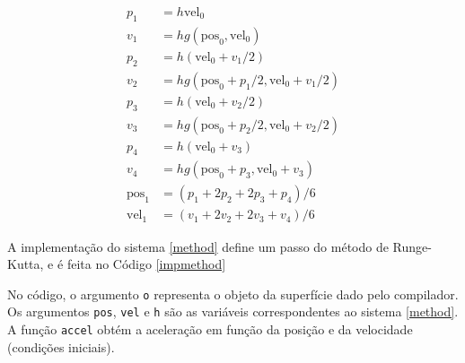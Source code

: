 \begin{equation}
\label{method}
\begin{split}
    p_1 & = h\text{vel}_0 \\
    v_1 & = hg(\text{pos}_0, \text{vel}_0) \\
    p_2 & = h(\text{vel}_0+v_1/2) \\
    v_2 & = hg(\text{pos}_0+p_1/2, \text{vel}_0+v_1/2) \\
    p_3 & = h(\text{vel}_0+v_2/2) \\
    v_3 & = hg(\text{pos}_0+p_2/2, \text{vel}_0+v_2/2) \\
    p_4 & = h(\text{vel}_0+v_3) \\
    v_4 & = hg(\text{pos}_0+p_3, \text{vel}_0+v_3) \\
    \text{pos}_1 & = (p_1+2p_2+2p_3+p_4)/6 \\
    \text{vel}_1 & = (v_1+2v_2+2v_3+v_4)/6
\end{split}
\end{equation}

A implementação do sistema \ref{method} define um passo do método de Runge-Kutta,
e é feita no Código \ref{impmethod}


No código, o argumento \texttt{o} representa o objeto da superfície dado pelo compilador.
Os argumentos \texttt{pos}, \texttt{vel} e \texttt{h} são as variáveis correspondentes ao sistema \ref{method}.
A função \texttt{accel} obtém a aceleração em função da posição e da velocidade
(condições iniciais).
